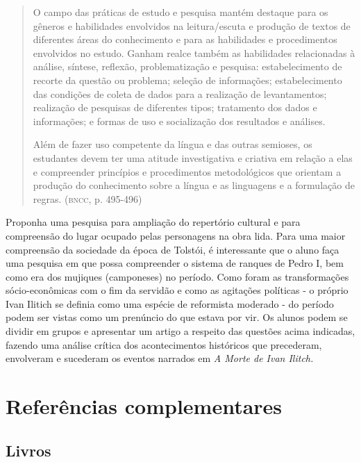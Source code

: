 \documentclass[12pt]{extarticle}
\begin{document}
\begin{quote}
O campo das práticas de estudo e pesquisa mantém destaque para os
gêneros e habilidades envolvidos na leitura/escuta e produção de textos
de diferentes áreas do conhecimento e para as habilidades e
procedimentos envolvidos no estudo. Ganham realce também as habilidades
relacionadas à análise, síntese, reflexão, problematização e pesquisa:
estabelecimento de recorte da questão ou problema; seleção de
informações; estabelecimento das condições de coleta de dados para a
realização de levantamentos; realização de pesquisas de diferentes
tipos; tratamento dos dados e informações; e formas de uso e
socialização dos resultados e análises.

Além de fazer uso competente da língua e das outras semioses, os
estudantes devem ter uma atitude investigativa e criativa em relação a
elas e compreender princípios e procedimentos metodológicos que orientam
a produção do conhecimento sobre a língua e as linguagens e a formulação
de regras. (\textsc{bncc}, p. 495-496)
\end{quote}


Proponha uma pesquisa para ampliação do repertório cultural e para
compreensão do lugar ocupado pelas personagens na obra lida. Para uma
maior compreensão da sociedade da época de Tolstói, é interessante que
o aluno faça uma pesquisa em que possa compreender o sistema de
ranques de Pedro I, bem como era dos mujiques (camponeses) no período.
Como foram as transformações sócio-econômicas com o fim da servidão e
como as agitações políticas - o próprio Ivan Ilitich se definia como
uma espécie de reformista moderado - do período podem ser vistas como
um prenúncio do que estava por vir. Os alunos podem se dividir em
grupos e apresentar um artigo a respeito das questões acima indicadas,
fazendo uma análise crítica dos acontecimentos históricos que
precederam, envolveram e sucederam os eventos narrados em \emph{A
Morte de Ivan Ilitch.}






\section{Referências complementares}

\subsection{Livros}
\end{document}
